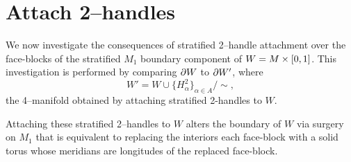 \section{Attach 2--handles}

We now investigate the consequences of stratified 2--handle attachment over the face-blocks of the stratified $M_1$ boundary component of $W=M\times[0,1]$.
This investigation is performed by comparing $\partial W$ to $\partial W'$, where
\[
	W' = W\cup\{H_\alpha^2\}_{\alpha\in A} / \sim,
\]
the 4--manifold obtained by attaching stratified 2-handles to $W$.

Attaching these stratified 2--handles to $W$ alters the boundary of $W$ via surgery on $M_1$ that is equivalent to replacing the interiors each face-block with a solid torus whose meridians are longitudes of the replaced face-block.
